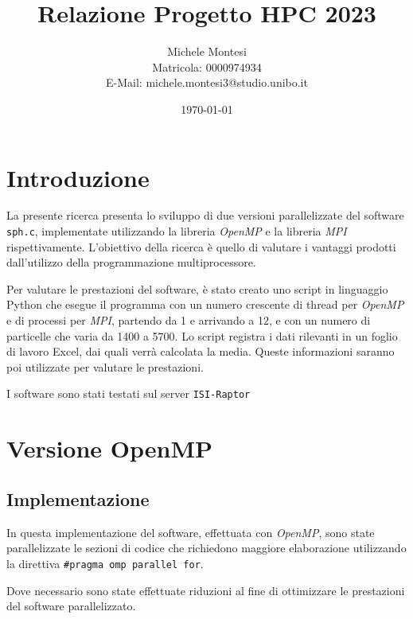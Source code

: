 \documentclass[a4paper, 12pt]{report}
\title{Relazione Progetto HPC 2023}
\author{Michele Montesi \\
        Matricola: 0000974934 \\
        E-Mail: michele.montesi3@studio.unibo.it}
\date{\today}
\begin{document}
\maketitle

\chapter*{Introduzione}
\begin{sloppypar}
La presente ricerca presenta lo sviluppo di due versioni parallelizzate del software \texttt{sph.c}, 
implementate utilizzando la libreria \textit{OpenMP} e la libreria \textit{MPI} rispettivamente. 
L'obiettivo della ricerca è quello di valutare i vantaggi prodotti dall'utilizzo della programmazione multiprocessore.
\end{sloppypar}

\bigskip

\begin{sloppypar}
\noindent
Per valutare le prestazioni del software, è stato creato uno script in linguaggio Python che esegue il programma 
con un numero crescente di thread per \textit{OpenMP} e di processi per \textit{MPI}, partendo da 1 e arrivando a 12, e con un numero di particelle che varia da 1400 
a 5700. Lo script registra i dati rilevanti in un foglio di lavoro Excel, dai quali verrà calcolata la media.
Queste informazioni saranno poi utilizzate per valutare le prestazioni.

\bigskip
\noindent
I software sono stati testati sul server \texttt{ISI-Raptor}

\end{sloppypar}

{\let\clearpage\relax\chapter*{Versione OpenMP}}
\section*{Implementazione}
\begin{sloppypar}
  \noindent
  In questa implementazione del software, effettuata con \textit{OpenMP}, sono state parallelizzate le sezioni di codice
  che richiedono maggiore elaborazione utilizzando la direttiva \texttt{\#pragma omp parallel for}.

  \smallskip
  \noindent
  Dove necessario sono state effettuate riduzioni al fine di ottimizzare le prestazioni del software parallelizzato.
\end{sloppypar}
\end{document}
